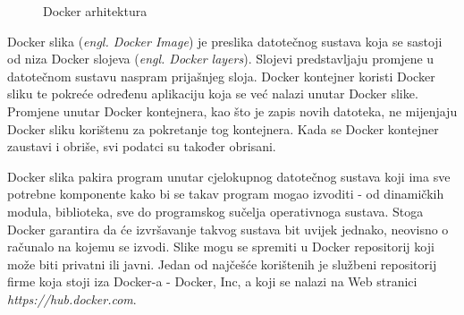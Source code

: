 \begin{figure}[h]
    \centering

    \caption{Docker arhitektura}%
    \label{fig:02docker}
\end{figure}

Docker slika (\textit{engl. Docker Image}) je preslika datotečnog sustava koja se sastoji od niza
Docker slojeva (\textit{engl. Docker layers}). Slojevi predstavljaju promjene u datotečnom sustavu
naspram prijašnjeg sloja. Docker kontejner koristi Docker sliku te pokreće određenu aplikaciju koja
se već nalazi unutar Docker slike. Promjene unutar Docker kontejnera, kao što je zapis novih
datoteka, ne mijenjaju Docker sliku korištenu za pokretanje tog kontejnera. Kada se Docker
kontejner zaustavi i obriše, svi podatci su također obrisani.

Docker slika pakira program unutar cjelokupnog datotečnog sustava koji ima sve potrebne komponente
kako bi se takav program mogao izvoditi - od dinamičkih modula, biblioteka, sve do programskog
sučelja operativnoga sustava. Stoga Docker garantira da će izvršavanje takvog sustava bit uvijek
jednako, neovisno o računalo na kojemu se izvodi. Slike mogu se spremiti u Docker repositorij
koji može biti privatni ili javni. Jedan od najčešće korištenih je službeni repositorij firme koja
stoji iza Docker-a - Docker, Inc, a koji se nalazi na Web stranici \textit{https://hub.docker.com}.

